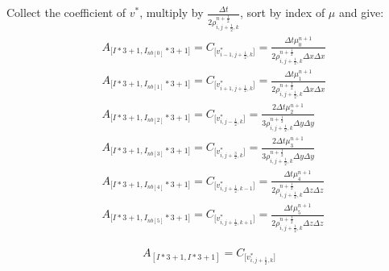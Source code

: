 \documentclass{article}
\numberwithin{equation}{subsection}
\begin{document}
Collect the coefficient of $v^*$, multiply by $\frac{\Delta t}{2 \rho^{n+\frac{1}{2}}_{i,j+\frac{1}{2},k}}$, sort by index of $\mu$ and give:
\begin{align}
\begin{split}
& A_{\Big[I*3+1,I_{nb[0]}*3+1\Big]} = C_{\Big[v^*_{i-1,j+\frac{1}{2},k}\Big]} = \frac{ \Delta t \mu^{n+1}_0}{2 \rho^{n+\frac{1}{2}}_{i,j+\frac{1}{2},k} \Delta x \Delta x} \\
& A_{\Big[I*3+1,I_{nb[1]}*3+1\Big]} = C_{\Big[v^*_{i+1,j+\frac{1}{2},k}\Big]} = \frac{ \Delta t \mu^{n+1}_1}{2 \rho^{n+\frac{1}{2}}_{i,j+\frac{1}{2},k} \Delta x \Delta x} \\
& A_{\Big[I*3+1,I_{nb[2]}*3+1\Big]} = C_{\Big[v^*_{i,j-\frac{1}{2},k}\Big]} = \frac{2\Delta t \mu^{n+1}_2}{3 \rho^{n+\frac{1}{2}}_{i,j+\frac{1}{2},k} \Delta y \Delta y} \\
& A_{\Big[I*3+1,I_{nb[3]}*3+1\Big]} = C_{\Big[v^*_{i,j+\frac{3}{2},k}\Big]} = \frac{2\Delta t \mu^{n+1}_3}{3 \rho^{n+\frac{1}{2}}_{i,j+\frac{1}{2},k} \Delta y \Delta y} \\
& A_{\Big[I*3+1,I_{nb[4]}*3+1\Big]} = C_{\Big[v^*_{i,j+\frac{1}{2},k-1}\Big]} = \frac{ \Delta t \mu^{n+1}_4}{2 \rho^{n+\frac{1}{2}}_{i,j+\frac{1}{2},k} \Delta z \Delta z} \\
& A_{\Big[I*3+1,I_{nb[5]}*3+1\Big]} = C_{\Big[v^*_{i,j+\frac{1}{2},k+1}\Big]} = \frac{ \Delta t \mu^{n+1}_5}{2 \rho^{n+\frac{1}{2}}_{i,j+\frac{1}{2},k} \Delta z \Delta z} 
\end{split}
\end{align}

\begin{equation}
A_{[I*3+1,I*3+1]} = C_{\Big[v^*_{i,j+\frac{1}{2},k}\Big]}
\end{equation}
\end{document}
